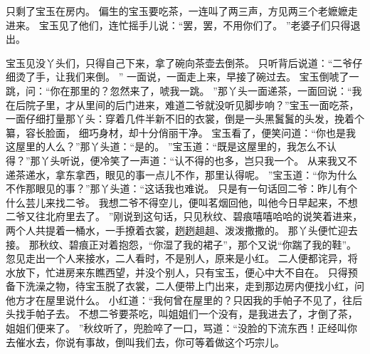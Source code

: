 只剩了宝玉在房内。
偏生的宝玉要吃茶，一连叫了两三声，方见两三个老嬷嬷走进来。
宝玉见了他们，连忙摇手儿说：“罢，罢，不用你们了。
”老婆子们只得退出。
\par
宝玉见没丫头们，只得自己下来，拿了碗向茶壶去倒茶。
只听背后说道：“二爷仔细烫了手，让我们来倒。
”
一面说，一面走上来，早接了碗过去。
宝玉倒唬了一跳，问：“你在那里的？忽然来了，唬我一跳。
”那丫头一面递茶，一面回说：“我在后院子里，才从里间的后门进来，难道二爷就没听见脚步响？”宝玉一面吃茶，一面仔细打量那丫头：穿着几件半新不旧的衣裳，倒是一头黑鬒鬒的头发，挽着个纂，容长脸面，
细巧身材，却十分俏丽干净。
宝玉看了，便笑问道：“你也是我这屋里的人么？”那丫头道：“是的。
”宝玉道：“既是这屋里的，我怎么不认得？”那丫头听说，便冷笑了一声道：“认不得的也多，岂只我一个。
从来我又不递茶递水，拿东拿西，眼见的事一点儿不作，那里认得呢。
”宝玉道：“你为什么不作那眼见的事？”那丫头道：“这话我也难说。
只是有一句话回二爷：昨儿有个什么芸儿来找二爷。
我想二爷不得空儿，便叫茗烟回他，叫他今日早起来，不想二爷又往北府里去了。
”刚说到这句话，只见秋纹、碧痕嘻嘻哈哈的说笑着进来，两个人共提着一桶水，一手撩着衣裳，趔趔趄趄、泼泼撒撒的。
那丫头便忙迎去接。
那秋纹、碧痕正对着抱怨，“你湿了我的裙子”，那个又说“你踹了我的鞋”。
忽见走出一个人来接水，二人看时，不是别人，原来是小红。
二人便都诧异，将水放下，忙进房来东瞧西望，并没个别人，只有宝玉，便心中大不自在。
只得预备下洗澡之物，待宝玉脱了衣裳，二人便带上门出来，走到那边房内便找小红，问他方才在屋里说什么。
小红道：“我何曾在屋里的？只因我的手帕子不见了，往后头找手帕子去。
不想二爷要茶吃，叫姐姐们一个没有，是我进去了，才倒了茶，姐姐们便来了。
”秋纹听了，兜脸啐了一口，骂道：“没脸的下流东西！正经叫你去催水去，你说有事故，倒叫我们去，你可等着做这个巧宗儿。
